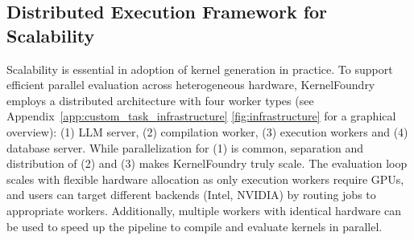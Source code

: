 \subsection{Distributed Execution Framework for Scalability}\label{sec:distributed}

Scalability is essential in adoption of kernel generation in practice. To support efficient parallel evaluation across heterogeneous hardware, KernelFoundry employs a distributed architecture with four worker types (see Appendix~\ref{app:custom_task_infrastructure} \autoref{fig:infrastructure} for a graphical overview): (1) LLM server, (2) compilation worker, (3) execution workers and (4) database server. While parallelization for (1) is common, separation and distribution of (2) and (3) makes KernelFoundry truly scale. 
The evaluation loop scales with flexible hardware allocation as only execution workers require GPUs, and users can target different backends (Intel, NVIDIA) by routing jobs to appropriate workers. Additionally, multiple workers with identical hardware can be used to speed up the pipeline to compile and evaluate kernels in parallel.

